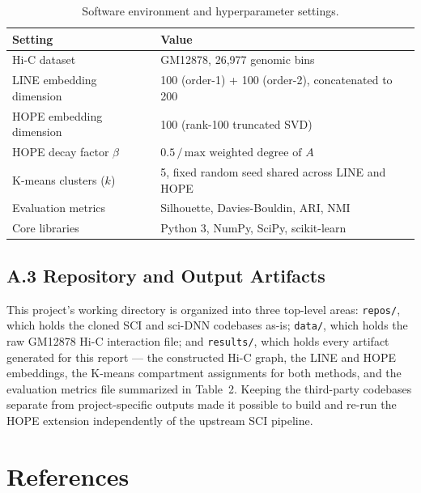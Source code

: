 \documentclass[12pt]{article}
\begin{document}
\begin{table}[h]
\centering
\caption{Software environment and hyperparameter settings.}
\label{tab:env}
\begin{tabular}{ll}
\toprule
\textbf{Setting} & \textbf{Value} \\
\midrule
Hi-C dataset & GM12878, 26{,}977 genomic bins \\
LINE embedding dimension & 100 (order-1) + 100 (order-2), concatenated to 200 \\
HOPE embedding dimension & 100 (rank-100 truncated SVD) \\
HOPE decay factor $\beta$ & $0.5 \,/\, \text{max weighted degree of } A$ \\
K-means clusters ($k$) & 5, fixed random seed shared across LINE and HOPE \\
Evaluation metrics & Silhouette, Davies-Bouldin, ARI, NMI \\
Core libraries & Python 3, NumPy, SciPy, scikit-learn \\
\bottomrule
\end{tabular}
\end{table}

\subsection*{A.3 Repository and Output Artifacts}
This project's working directory is organized into three top-level areas: \texttt{repos/}, which
holds the cloned SCI and sci-DNN codebases as-is; \texttt{data/}, which holds the raw GM12878
Hi-C interaction file; and \texttt{results/}, which holds every artifact generated for this
report — the constructed Hi-C graph, the LINE and HOPE embeddings, the K-means compartment
assignments for both methods, and the evaluation metrics file summarized in Table~2. Keeping the
third-party codebases separate from project-specific outputs made it possible to build and re-run
the HOPE extension independently of the upstream SCI pipeline.

\section{References}
\end{document}
